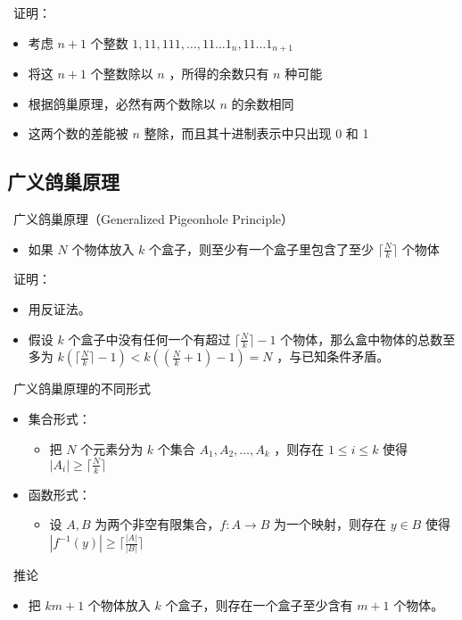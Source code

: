 \documentclass[UTF8]{report}
\theoremstyle{MyLineTheoremStyle} %
\theoremstyle{MyBlockTheoremStyle} %
\theoremstyle{MySubsubsectionStyle} %
\begin{document}
\textbullet\ 证明：
\begin{itemize}
    \item 考虑 $n + 1$ 个整数 $1, 11, 111, \ldots , 11\ldots 1_n , 11\ldots 1_{n+1}$
    \item 将这 $n + 1$ 个整数除以 $n$ ，所得的余数只有 $n$ 种可能
    \item 根据鸽巢原理，必然有两个数除以 $n$ 的余数相同
    \item 这两个数的差能被 $n$ 整除，而且其十进制表示中只出现 0 和 1
\end{itemize}

\subsection{广义鸽巢原理}
\textbullet\ 广义鸽巢原理（Generalized Pigeonhole Principle）
\begin{itemize}
    \item 如果 $N$ 个物体放入 $k$ 个盒子，则至少有一个盒子里包含了至少 $\lceil \frac{N}{k} \rceil$ 个物体
\end{itemize}

\textbullet\ 证明：
\begin{itemize}
    \item 用反证法。
    \item 假设 $k$ 个盒子中没有任何一个有超过 $\lceil \frac{N}{k} \rceil - 1$ 个物体，那么盒中物体的总数至多为 $k(\lceil \frac{N}{k} \rceil - 1) < k((\frac{N}{k}+1)-1) = N$ ，与已知条件矛盾。
\end{itemize}

\textbullet\ 广义鸽巢原理的不同形式
\begin{itemize}
    \item 集合形式：
    \begin{itemize}
        \item 把 $N$ 个元素分为 $k$ 个集合 $A_1, A_2, \ldots , A_k$ ，则存在 $1 \leq i \leq k$ 使得 $|A_i| \geq \lceil \frac{N}{k} \rceil$
    \end{itemize}
    \item 函数形式：
    \begin{itemize}
        \item 设 $A, B$ 为两个非空有限集合，$f: A \to B$ 为一个映射，则存在 $y \in B$ 使得 $|f^{-1}(y)| \geq \lceil \frac{|A|}{|B|} \rceil$
    \end{itemize}
\end{itemize}

\textbullet\ 推论
\begin{itemize}
    \item 把 $km + 1$ 个物体放入 $k$ 个盒子，则存在一个盒子至少含有 $m + 1$ 个物体。
\end{itemize}
\end{document}

